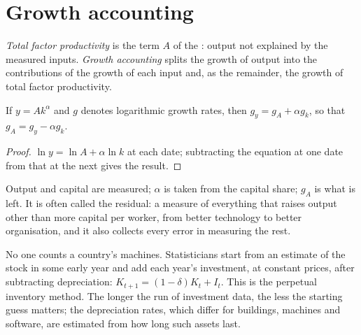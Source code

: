 \section{Growth accounting}\label{sec:g12:growth-and-production-function:accounting}

\begin{definition}\label{def:g12:growth-and-production-function:tfp}
\emph{Total factor productivity} is the term $A$ of the : output not explained by the measured inputs. \emph{Growth
accounting}\label{def:g12:growth-and-production-function:growth-accounting} splits the growth of output into the contributions of
the growth of each input and, as the remainder, the growth of total factor productivity.
\end{definition}

\begin{proposition}\label{prop:g12:growth-and-production-function:accounting}
If $y = Ak^{\alpha}$ and $g$ denotes logarithmic growth rates, then $g_y = g_A + \alpha g_k$, so that $g_A = g_y - \alpha g_k$.
\end{proposition}
\begin{proof}
$\ln y = \ln A + \alpha \ln k$ at each date; subtracting the equation at one date from that at the next gives the result.
\end{proof}

Output and capital are measured; $\alpha$ is taken from the capital share; $g_A$ is what is left. It is often called the residual: a measure of everything that raises
output other than more capital per worker, from better technology to better organisation, and it also collects every error in measuring the rest.

\begin{measure}
No one counts a country's machines. Statisticians start from an estimate of the stock in some early year and add each year's investment, at constant prices, after
subtracting depreciation: $K_{t+1} = (1 - \delta)K_t + I_t$. This is the perpetual inventory method. The longer the run of investment data, the less the starting guess
matters; the depreciation rates, which differ for buildings, machines and software, are estimated from how long such assets last.
\end{measure}

